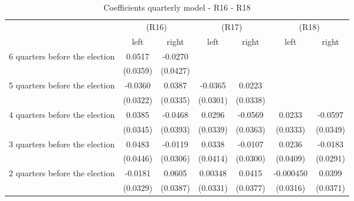 \begin{table}[!ht]\centering \scriptsize
\def\sym#1{\ifmmode^{#1}\else\(^{#1}\)\fi}
\caption{Coefficients quarterly model - R16 - R18}
\begin{tabular}{l*{6}{c}}
\hline\hline
                    &\multicolumn{2}{c}{(R16)}&\multicolumn{2}{c}{(R17)}&\multicolumn{2}{c}{(R18)}\\
&\multicolumn{1}{c}{left}&\multicolumn{1}{c}{right}&\multicolumn{1}{c}{left}&\multicolumn{1}{c}{right}&\multicolumn{1}{c}{left}&\multicolumn{1}{c}{right}\\
\hline
 6 quarters before the election&      0.0517         &     -0.0270         &                     &                     &                     &                     \\
                    &    (0.0359)         &    (0.0427)         &                     &                     &                     &                     \\
[0,12em]
 5 quarters before the election&     -0.0360         &      0.0387         &     -0.0365         &      0.0223         &                     &                     \\
                    &    (0.0322)         &    (0.0335)         &    (0.0301)         &    (0.0338)         &                     &                     \\
[0,12em]
 4 quarters before the election&      0.0385         &     -0.0468         &      0.0296         &     -0.0569         &      0.0233         &     -0.0597         \\
                    &    (0.0345)         &    (0.0393)         &    (0.0339)         &    (0.0363)         &    (0.0333)         &    (0.0349)         \\
[0,12em]
 3 quarters before the election&      0.0483         &     -0.0119         &      0.0338         &     -0.0107         &      0.0236         &     -0.0183         \\
                    &    (0.0446)         &    (0.0306)         &    (0.0414)         &    (0.0300)         &    (0.0409)         &    (0.0291)         \\
[0,12em]
 2 quarters before the election&     -0.0181         &      0.0605         &     0.00348         &      0.0415         &   -0.000450         &      0.0399         \\
                    &    (0.0329)         &    (0.0387)         &    (0.0331)         &    (0.0377)         &    (0.0316)         &    (0.0371)         \\

\end{tabular}
\end{table}
